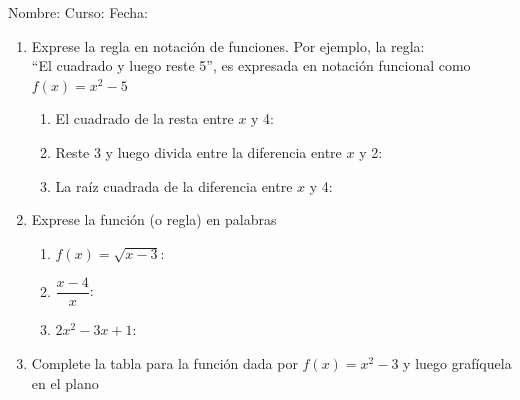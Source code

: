 \documentclass[fleqn]{article}
\newcommand{\LineaNombre}{%
\par
\vspace{\baselineskip}
Nombre:\hrulefill \; Curso: \underline{\hspace*{48pt}} \; Fecha: \underline{\hspace*{2.5cm}} \relax
\par}
\begin{document}
\LineaNombre
\begin{enumerate}
 \item Exprese la regla en notación de funciones. Por ejemplo, la regla:\\
  ``El cuadrado y luego reste 5'', es expresada en notación funcional como $f(x)=x^{2}-5$
 \begin{enumerate}
  \item El cuadrado de la resta entre $x$ y 4: \dotfill
  \item Reste 3 y luego divida entre la diferencia entre $x$ y 2: \dotfill
  \item La raíz cuadrada de la diferencia entre $x$ y 4: \dotfill
 \end{enumerate}
\item Exprese la función (o regla) en palabras
\begin{enumerate}
 \item $f(x)=\sqrt{x-3}$: \dotfill
 \item $\dfrac{x-4}{x}$: \dotfill
 \item $2x^{2}-3x+1$: \dotfill
\end{enumerate}
\item Complete la tabla para la función dada por $f(x)=x^{2}-3$ y luego grafíquela en el plano


\end{enumerate}
\end{document}
